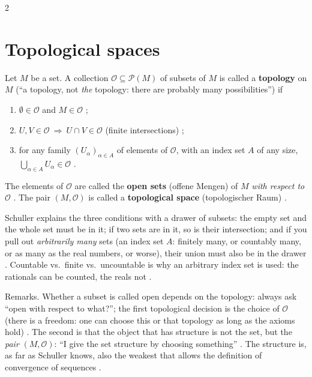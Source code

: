 \begin{paracol}{2}
\section{Topological spaces}\label{sec:tm-top}

\begin{definition}\label{def:tm-topology}
Let $M$ be a set. A collection $\mathcal O\subseteq\mathcal P(M)$ of subsets of $M$ is called a \textbf{topology} on
$M$ (``a topology, not \emph{the} topology: there are probably many possibilities'') if
\begin{enumerate}
  \item $\emptyset\in\mathcal O$ and $M\in\mathcal O$ ;
  \item $U,V\in\mathcal O\ \Rightarrow\ U\cap V\in\mathcal O$ (finite intersections) ;
  \item for any family $(U_\alpha)_{\alpha\in A}$ of elements of $\mathcal O$, with an index set $A$ of any size,
        $\bigcup_{\alpha\in A}U_\alpha\in\mathcal O$ .
\end{enumerate}
The elements of $\mathcal O$ are called the \textbf{open sets} (offene Mengen) of $M$ \emph{with respect to}
$\mathcal O$ . The pair $(M,\mathcal O)$ is called a \textbf{topological
space} (topologischer Raum) .
\end{definition}
\begin{coursenote}
Schuller explains the three conditions with a drawer of subsets: the empty set and the whole set must be in it; if two
sets are in it, so is their intersection; and if you pull out \emph{arbitrarily many} sets (an index set $A$: finitely many,
or countably many, or as many as the real numbers, or worse), their union must also be in the drawer
. Countable vs.\ finite vs.\ uncountable is why an arbitrary index set is used: the
rationals can be counted, the reals not .
\end{coursenote}
Remarks. Whether a subset is called open depends on the topology: always ask ``open with respect to what?''; the
first topological decision is the choice of $\mathcal O$ (there is a freedom: one can choose this or that
topology as long as the axioms hold) . The second is that the object that has structure is
not the set, but the \emph{pair} $(M,\mathcal O)$: ``I give the set structure by choosing something''
. The structure is, as far as Schuller knows, also the weakest that allows the definition
of convergence of sequences .


\end{paracol}

